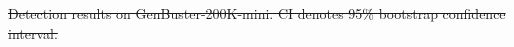 \documentclass{ieeeaccess}
\providecommand{\DIFdeltex}[1]{{\protect\color{red}\sout{#1}}}                      %
\providecommand{\DIFdelFL}[1]{\DIFdel{#1}} %
\providecommand{\DIFdel}[1]{\texorpdfstring{\DIFdeltex{#1}}{}} %
\begin{document}
{%
\DIFdelFL{Detection results on GenBuster-200K-mini. CI denotes 95\% bootstrap confidence
interval.}}
\end{document}
